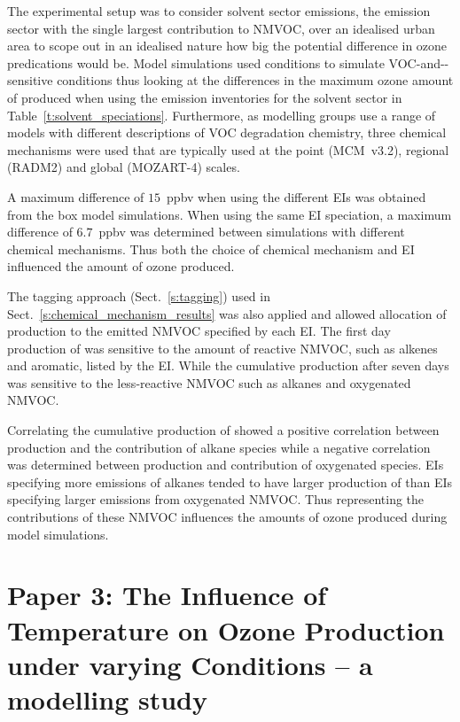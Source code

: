 The experimental setup was to consider solvent sector emissions, the emission sector with the single largest contribution to NMVOC, over an idealised urban area to scope out in an idealised nature how big the potential difference in ozone predications would be.
Model simulations used  conditions to simulate VOC-and--sensitive conditions thus looking at the differences in the maximum ozone amount of produced when using the emission inventories for the solvent sector in Table~\ref{t:solvent_speciations}.
Furthermore, as modelling groups use a range of models with different descriptions of VOC degradation chemistry, three chemical mechanisms were used that are typically used at the point (MCM~v3.2), regional (RADM2) and global (MOZART-4) scales.

A maximum difference of $15$~ppbv when using the different EIs was obtained from the box model simulations.
When using the same EI speciation, a maximum difference of $6.7$~ppbv was determined between simulations with different chemical mechanisms.
Thus both the choice of chemical mechanism and EI influenced the amount of ozone produced.

The tagging approach (Sect.~\ref{s:tagging}) used in Sect.~\ref{s:chemical_mechanism_results} was also applied and allowed allocation of  production to the emitted NMVOC specified by each EI.
The first day production of  was sensitive to the amount of reactive NMVOC, such as alkenes and aromatic, listed by the EI.
While the cumulative  production after seven days was sensitive to the less-reactive NMVOC such as alkanes and oxygenated NMVOC.

Correlating the cumulative production of  showed a positive correlation between  production and the contribution of alkane species while a negative correlation was determined between  production and contribution of oxygenated species.
EIs specifying more emissions of alkanes tended to have larger production of  than EIs specifying larger emissions from oxygenated NMVOC.
Thus representing the contributions of these NMVOC influences the amounts of ozone produced during model simulations.

\singlespacing
\section[Paper 3]{Paper 3: The Influence of Temperature on Ozone Production under varying  Conditions -- a modelling study} \label{s:T-O3_results}
\onehalfspacing

